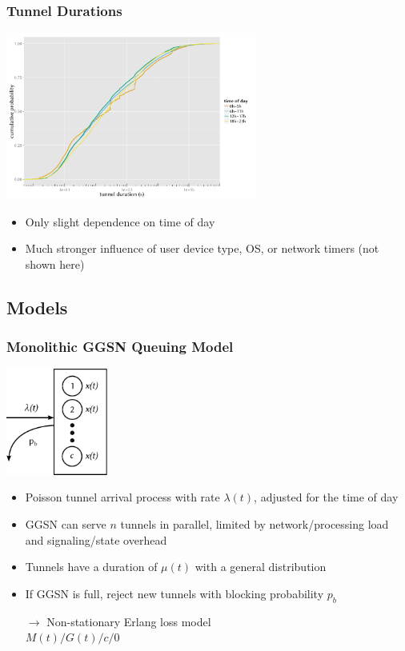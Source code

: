 \documentclass{beamer}
\begin{document}
\begin{frame}
	\frametitle{Tunnel Durations}
	\begin{center}
		\includegraphics[height=5.5cm]{../../chapters/04-mobilenets/images/R-duration-timeofday-ecdf.pdf}
	\end{center}

	\begin{itemize}
		\item Only slight dependence on time of day
		\item Much stronger influence of user device type, OS, or network timers (not shown here)
	\end{itemize}
\end{frame}

\subsection{Models}


\begin{frame}
	\frametitle{Monolithic GGSN Queuing Model}
		\begin{center}
			\includegraphics[height=3.5cm]{../../chapters/04-mobilenets/images/ggsn-monolithic.pdf}
		\end{center}

		\begin{itemize}
			\item Poisson tunnel arrival process with rate $\lambda(t)$, adjusted for the time of day
			\item GGSN can serve $n$ tunnels in parallel, limited by network/processing load and signaling/state overhead
			\item Tunnels have a duration of $\mu(t)$ with a general distribution
			\item If GGSN is full, reject new tunnels with blocking probability $p_b$
			\item[$\rightarrow$] Non-stationary Erlang loss model \\ $M(t)/G(t)/c/0$ 
		\end{itemize}

\end{frame}
\end{document}
